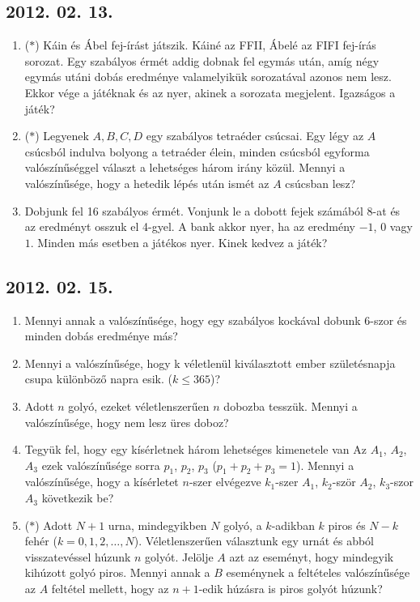\documentclass{article}
\begin{document}
\subsection*{2012. 02. 13.}
\begin{enumerate}
\item ($*$)
Káin és Ábel fej-írást játszik. Káiné az FFII, Ábelé az FIFI fej-írás sorozat. Egy szabályos érmét addig dobnak fel egymás után, amíg négy egymás utáni dobás eredménye valamelyikük sorozatával azonos nem lesz. Ekkor vége a játéknak és az nyer, akinek a sorozata megjelent. Igazságos a játék?
\item ($*$)
Legyenek $A, B, C, D$ egy szabályos tetraéder csúcsai. Egy légy az $A$ csúcsból indulva bolyong a tetraéder élein, minden csúcsból egyforma valószínűséggel választ a lehetséges három irány közül. Mennyi a valószínűsége, hogy a hetedik lépés után ismét az $A$ csúcsban lesz?
\item
Dobjunk fel 16 szabályos érmét. Vonjunk le a dobott fejek számából 8-at és az eredményt osszuk el 4-gyel. A bank akkor nyer, ha az eredmény $-1$, $0$ vagy $1$. Minden más esetben a játékos nyer. Kinek kedvez a játék?
\end{enumerate}

\subsection*{2012. 02. 15.}
\begin{enumerate}
\item
Mennyi annak a valószínűsége, hogy egy szabályos kockával dobunk 6-szor és minden dobás eredménye más?
\item
Mennyi a valószínűsége, hogy k véletlenül kiválasztott ember születésnapja csupa különböző napra esik. ($k\le 365$)?
\item
Adott $n$ golyó, ezeket véletlenszerűen $n$ dobozba tesszük. Mennyi a valószínűsége, hogy nem lesz üres doboz?
\item Tegyük fel, hogy egy kísérletnek három lehetséges kimenetele van Az $A_{1}$, $A_{2}$, $A_{3}$ ezek valószínűsége sorra $p_{1}$, $p_{2}$, $p_{3}$ ($p_{1}+p_{2}+p_{3}=1$). Mennyi a valószínűsége, hogy a kísérletet $n$-szer elvégezve $k_{1}$-szer $A_{1}$, $k_{2}$-ször $A_{2}$, $k_{3}$-szor $A_{3}$ következik be?
\item ($*$)
Adott $N+1$ urna, mindegyikben $N$ golyó, a $k$-adikban $k$ piros és $N-k$ fehér ($k=0, 1, 2, \ldots, N$). Véletlenszerűen választunk egy urnát és abból visszatevéssel húzunk $n$ golyót. Jelölje $A$ azt az eseményt, hogy mindegyik kihúzott golyó piros. Mennyi annak a $B$ eseménynek a feltételes valószínűsége az $A$ feltétel mellett, hogy az $n+1$-edik húzásra is piros golyót húzunk?
\end{enumerate}
\end{document}
